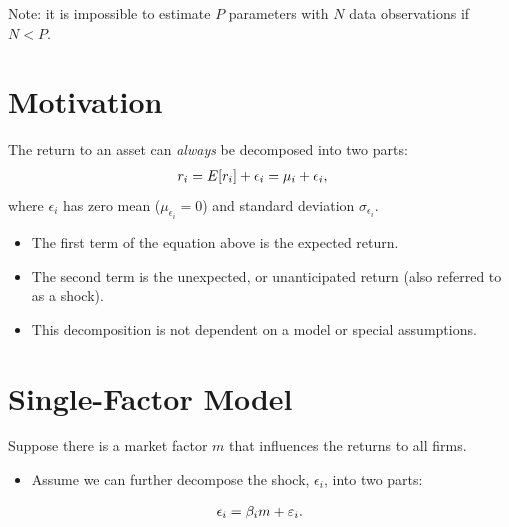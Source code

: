 \documentclass[letterpaper,10pt,english]{sphinxmanual}
\begin{document}
Note: it is impossible to estimate $P$ parameters with $N$
data observations if $N < P$.


\section{Motivation}
\label{indexModels:id1}
The return to an asset can \emph{always} be decomposed into two parts:
\begin{gather}
\begin{split}r_i & = E[r_i] + \epsilon_i = \mu_i + \epsilon_i,\end{split}\notag
\end{gather}
where $\epsilon_i$ has zero mean ($\mu_{\epsilon_i} = 0$)
and standard deviation $\sigma_{\epsilon_i}$.
\begin{itemize}
\item {} 
The first term of the equation above is the expected return.

\end{itemize}
\begin{itemize}
\item {} 
The second term is the unexpected, or unanticipated return (also
referred to as a shock).

\end{itemize}
\begin{itemize}
\item {} 
This decomposition is not dependent on a model or special
assumptions.

\end{itemize}


\section{Single-Factor Model}
\label{indexModels:single-factor-model}
Suppose there is a market factor $m$ that influences the returns
to all firms.
\begin{itemize}
\item {} 
Assume we can further decompose the shock, $\epsilon_i$, into
two parts:

\end{itemize}
\begin{gather}
\begin{split}\epsilon_i = \beta_i m + \varepsilon_i.\end{split}\notag
\end{gather}
\end{document}
